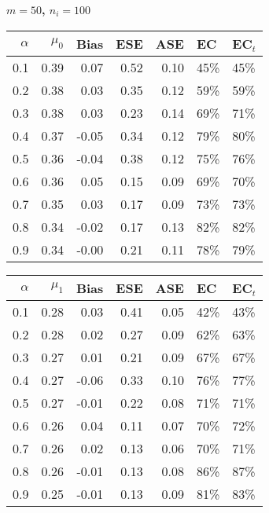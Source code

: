 \documentclass[12pt, letterpaper]{article}
\begin{document}
\clearpage



\begin{center}
	\textbf{$m=50$, $n_i=100$} 
\end{center}
\begin{table}[ht!]
	\centering
	\bgroup
	\def\arraystretch{1.25}
	\setlength\tabcolsep{0.05in}
	\begin{tabular}{rrrrrll}
		\hline
		$\alpha$ & $\mu_0$ & Bias & ESE & ASE & EC & EC$_t$ \\ 
		\hline
		0.1 & 0.39 & 0.07 & 0.52 & 0.10 & 45\% & 45\% \\ 
		0.2 & 0.38 & 0.03 & 0.35 & 0.12 & 59\% & 59\% \\ 
		0.3 & 0.38 & 0.03 & 0.23 & 0.14 & 69\% & 71\% \\ 
		0.4 & 0.37 & -0.05 & 0.34 & 0.12 & 79\% & 80\% \\ 
		0.5 & 0.36 & -0.04 & 0.38 & 0.12 & 75\% & 76\% \\ 
		0.6 & 0.36 & 0.05 & 0.15 & 0.09 & 69\% & 70\% \\ 
		0.7 & 0.35 & 0.03 & 0.17 & 0.09 & 73\% & 73\% \\ 
		0.8 & 0.34 & -0.02 & 0.17 & 0.13 & 82\% & 82\% \\ 
		0.9 & 0.34 & -0.00 & 0.21 & 0.11 & 78\% & 79\% \\ 
		\hline
	\end{tabular}
	\egroup
	\quad 
	\bgroup
	\setlength\tabcolsep{0.05in}
	\def\arraystretch{1.25}
	\begin{tabular}{rrrrrll}
		\hline
		$\alpha$ & $\mu_1$ & Bias & ESE & ASE & EC & EC$_t$ \\
		\hline
		0.1 & 0.28 & 0.03 & 0.41 & 0.05 & 42\% & 43\% \\ 
		0.2 & 0.28 & 0.02 & 0.27 & 0.09 & 62\% & 63\% \\ 
		0.3 & 0.27 & 0.01 & 0.21 & 0.09 & 67\% & 67\% \\ 
		0.4 & 0.27 & -0.06 & 0.33 & 0.10 & 76\% & 77\% \\ 
		0.5 & 0.27 & -0.01 & 0.22 & 0.08 & 71\% & 71\% \\ 
		0.6 & 0.26 & 0.04 & 0.11 & 0.07 & 70\% & 72\% \\ 
		0.7 & 0.26 & 0.02 & 0.13 & 0.06 & 70\% & 71\% \\ 
		0.8 & 0.26 & -0.01 & 0.13 & 0.08 & 86\% & 87\% \\ 
		0.9 & 0.25 & -0.01 & 0.13 & 0.09 & 81\% & 83\% \\
		\hline
	\end{tabular}

\end{table}
\end{document}
